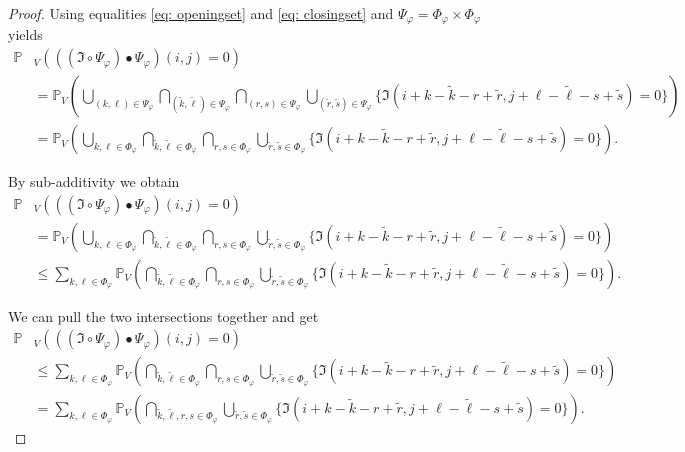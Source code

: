 \documentclass[a4paper,12pt]{article}
\theoremstyle{plain}
\theoremstyle{definition}
\numberwithin{equation}{section}
\begin{document}
\begin{appendix}
\begin{proof}
		Using equalities \eqref{eq: openingset} and \eqref{eq: closingset} and $\Psi_\varphi = \Phi_\varphi \times \Phi_\varphi$ yields
		\begin{align*}
			\mathbb{P}&_V\left( ((\mathfrak{I} \circ \Psi_\varphi) \bullet \Psi_\varphi)(i, j) = 0 \right) \\
			&= \mathbb{P}_V\left( \bigcup_{(k, \ell) \in \Psi_\varphi} \bigcap_{(\tilde{k}, \tilde{\ell}) \in \Psi_\varphi} \bigcap_{(r, s) \in \Psi_\varphi} \bigcup_{(\tilde{r}, \tilde{s}) \in \Psi_\varphi} \{ \mathfrak{I}(i + k - \tilde{k} - r + \tilde{r}, j + \ell - \tilde{\ell} - s + \tilde{s}) = 0 \} \right) \\
			&= \mathbb{P}_V\left( \bigcup_{k, \ell \in \Phi_\varphi} \bigcap_{\tilde{k}, \tilde{\ell} \in \Phi_\varphi} \bigcap_{r, s \in \Phi_\varphi} \bigcup_{\tilde{r}, \tilde{s} \in \Phi_\varphi} \{ \mathfrak{I}(i + k - \tilde{k} - r + \tilde{r}, j + \ell - \tilde{\ell} - s + \tilde{s}) = 0 \} \right).
		\end{align*}
		
		By sub-additivity we obtain
		\begin{align*}
			\mathbb{P}&_V\left( ((\mathfrak{I} \circ \Psi_\varphi) \bullet \Psi_\varphi)(i, j) = 0 \right) \\
			&= \mathbb{P}_V\left( \bigcup_{k, \ell \in \Phi_\varphi} \bigcap_{\tilde{k}, \tilde{\ell} \in \Phi_\varphi} \bigcap_{r, s \in \Phi_\varphi} \bigcup_{\tilde{r}, \tilde{s} \in \Phi_\varphi} \{ \mathfrak{I}(i + k - \tilde{k} - r + \tilde{r}, j + \ell - \tilde{\ell} - s + \tilde{s}) = 0 \} \right) \\
			&\leq \sum_{k, \ell \in \Phi_\varphi} \mathbb{P}_V\left( \bigcap_{\tilde{k}, \tilde{\ell} \in \Phi_\varphi} \bigcap_{r, s \in \Phi_\varphi} \bigcup_{\tilde{r}, \tilde{s} \in \Phi_\varphi} \{ \mathfrak{I}(i + k - \tilde{k} - r + \tilde{r}, j + \ell - \tilde{\ell} - s + \tilde{s}) = 0 \} \right).
		\end{align*}
		
		We can pull the two intersections together and get
		\begin{align*}
			\mathbb{P}&_V\left( ((\mathfrak{I} \circ \Psi_\varphi) \bullet \Psi_\varphi)(i, j) = 0 \right) \\
			&\leq \sum_{k, \ell \in \Phi_\varphi} \mathbb{P}_V\left( \bigcap_{\tilde{k}, \tilde{\ell} \in \Phi_\varphi} \bigcap_{r, s \in \Phi_\varphi} \bigcup_{\tilde{r}, \tilde{s} \in \Phi_\varphi} \{ \mathfrak{I}(i + k - \tilde{k} - r + \tilde{r}, j + \ell - \tilde{\ell} - s + \tilde{s}) = 0 \} \right) \\
			&= \sum_{k, \ell \in \Phi_\varphi} \mathbb{P}_V\left( \bigcap_{\tilde{k}, \tilde{\ell}, r, s \in \Phi_\varphi} \bigcup_{\tilde{r}, \tilde{s} \in \Phi_\varphi} \{ \mathfrak{I}(i + k - \tilde{k} - r + \tilde{r}, j + \ell - \tilde{\ell} - s + \tilde{s}) = 0 \} \right).
		\end{align*}
		

\end{proof}
\end{appendix}
\end{document}
